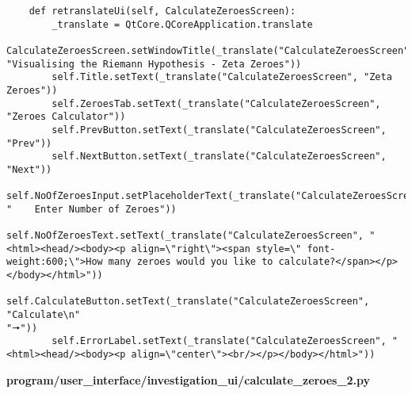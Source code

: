 \documentclass{article}
\begin{document}
\begin{lstlisting}
    def retranslateUi(self, CalculateZeroesScreen):
        _translate = QtCore.QCoreApplication.translate
        CalculateZeroesScreen.setWindowTitle(_translate("CalculateZeroesScreen", "Visualising the Riemann Hypothesis - Zeta Zeroes"))
        self.Title.setText(_translate("CalculateZeroesScreen", "Zeta Zeroes"))
        self.ZeroesTab.setText(_translate("CalculateZeroesScreen", "Zeroes Calculator"))
        self.PrevButton.setText(_translate("CalculateZeroesScreen", "Prev"))
        self.NextButton.setText(_translate("CalculateZeroesScreen", "Next"))
        self.NoOfZeroesInput.setPlaceholderText(_translate("CalculateZeroesScreen", "    Enter Number of Zeroes"))
        self.NoOfZeroesText.setText(_translate("CalculateZeroesScreen", "<html><head/><body><p align=\"right\"><span style=\" font-weight:600;\">How many zeroes would you like to calculate?</span></p></body></html>"))
        self.CalculateButton.setText(_translate("CalculateZeroesScreen", "Calculate\n"
"🠖"))
        self.ErrorLabel.setText(_translate("CalculateZeroesScreen", "<html><head/><body><p align=\"center\"><br/></p></body></html>"))
\end{lstlisting}


\textbf{program/user\_interface/investigation\_ui/calculate\_zeroes\_2.py}
\end{document}
